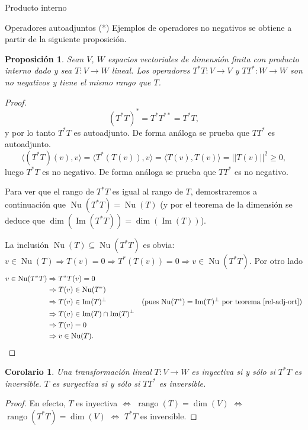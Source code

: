 \documentclass[a4paper,12pt,twoside,spanish,reqno]{amsbook}
\numberwithin{equation}{section}
\newtheorem{proposicion}[teorema]{Proposici\'on}
\newtheorem{corolario}[teorema]{Corolario}
\theoremstyle{definition}
\theoremstyle{remark}
\newcommand\im{\operatorname{Im}}
\renewcommand\nu{\operatorname{Nu}}
\newcommand{\la}{\langle}
\newcommand{\ra}{\rangle}
\begin{document}
\begin{chapter}{Producto interno}
\begin{section}{Operadores autoadjuntos (*)}
        Ejemplos de operadores no negativos se obtiene a partir de la siguiente proposición.
        
        \begin{proposicion}\label{prop5.26}
            Sean $V$, $W$ espacios vectoriales de dimensión finita con producto interno dado y sea $T: V \to W$ lineal. Los operadores $T^*T: V \to V$ y $TT^*: W \to W$ son  no negativos y tiene el mismo rango que $T$.
        \end{proposicion}
        \begin{proof}
            $$
            (T^*T)^* = T^* T^{**} = T^*T,
            $$
            y por lo tanto $T^*T$ es autoadjunto. De forma análoga se prueba que $TT^*$ es autoadjunto.
            $$
            \la (T^*T)(v), v \ra = \la T^*(T(v)), v \ra = \la T(v), T(v) \ra = ||T(v)||^2 \ge 0,  
            $$
            luego $T^*T$  es no negativo.  De forma análoga se prueba que $TT^*$ es no negativo.
            
            Para ver que el rango de $T^*T$ es igual al rango  de $T$, demostraremos a continuación que  $\nu(T^*T) = \nu(T)$ (y por el teorema de la dimensión se deduce que $\dim(\im(T^*T)) = \dim(\im(T))$).
            
            La inclusión $\nu(T) \subseteq \nu(T^*T)$ es obvia:  $v \in \nu(T) \Rightarrow T(v) = 0 \Rightarrow T^*(T(v)) =0 \Rightarrow v \in \nu(T^*T)$. Por otro lado
            \begin{align*}
                v \in \nu(T^*T) &\Rightarrow T^*T(v) = 0& & \\
                &\Rightarrow T(v) \in \nu(T^*) && \\
                &\Rightarrow T(v) \in \im(T)^\perp &&\text{(pues $\nu(T^*) = \im(T)^\perp$  por teorema \ref{rel-adj-ort})} \\
                &\Rightarrow T(v) \in \im(T) \cap \im(T)^\perp&&\\
                &\Rightarrow T(v) = 0 &&\\
                &\Rightarrow v \in \nu(T). &&
            \end{align*}
        \end{proof}
        
        
        
        \begin{corolario}\label{cor5.27}
            Una transformación lineal $T: V \to W$ es inyectiva si y sólo si $T^*T$ es inversible. $T$ es suryectiva si y sólo si $TT^*$ es inversible.
        \end{corolario}
        \begin{proof}
            En  efecto, $T$ es inyectiva $\Leftrightarrow$  $\operatorname{rango}(T) = \dim(V)$ $\Leftrightarrow$  $\operatorname{rango}(T^*T) = \dim(V)$   $\Leftrightarrow$  $T^*T$  es inversible.
            

\end{proof}
\end{section}
\end{chapter}
\end{document}
